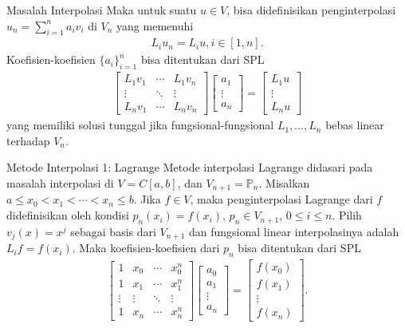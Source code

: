 \documentclass[xcolor={dvipsnames}, 9pt]{beamer}
\begin{document}
    \begin{frame}{Masalah Interpolasi}
        Maka untuk suatu $u\in V$, bisa didefinisikan penginterpolasi $u_n = \sum_{i=1}^n a_iv_i$ di $V_n$ yang memenuhi
        \begin{align*}
            L_iu_n = L_iu, i\in[1,n].
        \end{align*}
        Koefisien-koefisien $\{a_i\}_{i=1}^n$ bisa ditentukan dari SPL
        \begin{align*}
            \begin{bmatrix}
                L_1v_1 & \cdots & L_1v_n \\
                \vdots & \ddots & \vdots \\
                L_nv_1 & \cdots & L_nv_n
            \end{bmatrix}
            \begin{bmatrix}
                a_1 \\ \vdots \\ a_n
            \end{bmatrix}=
            \begin{bmatrix}
                L_1u \\ \vdots \\ L_nu
            \end{bmatrix}
        \end{align*}
        yang memiliki solusi tunggal jika fungsional-fungsional $L_1,\dots,L_n$ bebas linear terhadap $V_n$.
    \end{frame}
    \begin{frame}{Metode Interpolasi 1: Lagrange}
        Metode interpolasi Lagrange didasari pada masalah interpolasi di $V=C[a,b]$, dan $V_{n+1}=\mathbb{P}_n$. Misalkan $a\leq x_0 < x_1 < \cdots < x_n \leq b$. Jika $f\in V$, maka penginterpolasi Lagrange dari $f$ didefinisikan oleh kondisi $p_n(x_i)=f(x_i)$, $p_n\in V_{n+1}$, $0\leq i\leq n$. Pilih $v_j(x)=x^j$ sebagai basis dari $V_{n+1}$ dan fungsional linear interpolasinya adalah $L_if = f(x_i)$. Maka koefisien-koefisien dari $p_n$ bisa ditentukan dari SPL
        \begin{align}
            \begin{bmatrix}
                1 & x_0 & \cdots & x_0^n \\
                1 & x_1 & \cdots & x_1^n \\
                \vdots & \vdots & \ddots & \vdots \\
                1 & x_n & \cdots & x_n^n
            \end{bmatrix}
            \begin{bmatrix}
                a_0 \\ a_1 \\ \vdots \\ a_n
            \end{bmatrix} = 
            \begin{bmatrix}
                f(x_0) \\ f(x_1) \\ \vdots \\ f(x_n)
            \end{bmatrix}.
        \end{align}
    \end{frame}
\end{document}
